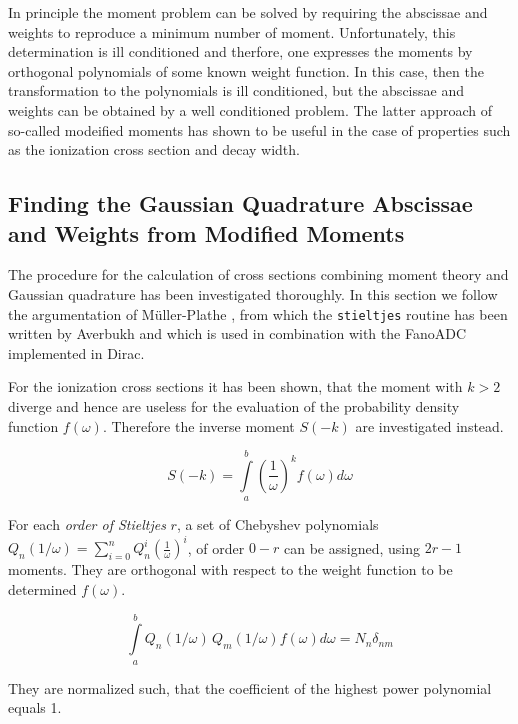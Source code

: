 In principle the moment problem can be solved by requiring the abscissae and
weights to reproduce a minimum number of moment. Unfortunately, this determination
is ill conditioned and therfore, one expresses the moments by orthogonal
polynomials of some known weight function. In this case, then the
transformation to the polynomials is ill conditioned, but the abscissae
and weights can be obtained by a well conditioned problem. The latter approach
of so-called modeified moments has shown to be useful in the case of
properties such as the ionization
cross section and decay width.





\subsection{Finding the Gaussian Quadrature Abscissae and Weights from Modified Moments}

The procedure for the calculation of cross sections combining moment
theory and Gaussian quadrature has been investigated thoroughly. In this section
we follow the argumentation of Müller-Plathe \cite{}, from which the
\verb|stieltjes| routine has been written by Averbukh and which is used in
combination with the FanoADC implemented in Dirac.

For the ionization cross sections it has been shown, that the moment with
$k>2$ diverge and hence are useless for the evaluation of the probability
density function $f(\omega)$. Therefore the inverse moment $S(-k)$ are investigated
instead.

\begin{equation}
  S(-k) = \int\limits_a^b \left( \frac{1}{\omega} \right) ^k f(\omega) d\omega
\end{equation}

For each \emph{order of Stieltjes} $r$, a set of
Chebyshev polynomials
$Q_n (1/\omega) = \sum\limits_{i=0}^n Q_n^{i}\left( \frac{1}{\omega} \right)^{i}$,
of order $0-r$ can be assigned, using $2r-1$ moments.
They are orthogonal with respect to the weight function
to be determined $f(\omega)$.

\begin{equation}
  \int\limits_a^b Q_n(1/\omega) \, Q_m(1/\omega) f(\omega) d\omega = N_n \delta_{nm}
\end{equation}

They are normalized such, that the coefficient of the highest power polynomial
equals 1.

